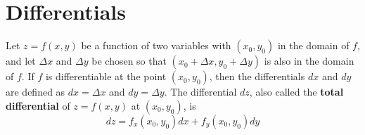 \documentclass{article}
\begin{document}
\section*{Differentials}

Let $z=f(x,y)$ be a function of two variables with $(x_0,y_0)$ in the domain of $f$, and let $\Delta x$ and $\Delta y$ be chosen so that $(x_0+\Delta x, y_0+\Delta y)$ is also in the domain of $f$. If $f$ is differentiable at the point $(x_0,y_0)$, then the differentials $dx$ and $dy$ are defined as $dx=\Delta x$ and $dy=\Delta y$. The differential $dz$, also called the \textbf{total differential} of $z=f(x,y)$ at $(x_0,y_0)$, is
\[dz=f_x(x_0,y_0)dx+f_y(x_0,y_0)dy\]
\end{document}
